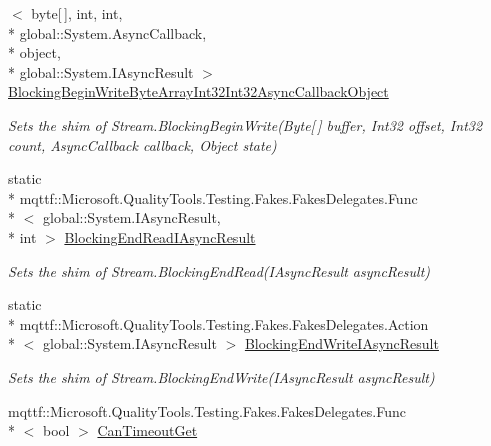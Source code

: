 \begin{DoxyCompactItemize}
$<$ byte\mbox{[}$\,$\mbox{]}, int, int, \\*
global\-::\-System.\-Async\-Callback, \\*
object, \\*
global\-::\-System.\-I\-Async\-Result $>$ \hyperlink{class_system_1_1_i_o_1_1_fakes_1_1_shim_stream_a09da5c6c1a4e8d9bc9e2c88b9a618af1}{Blocking\-Begin\-Write\-Byte\-Array\-Int32\-Int32\-Async\-Callback\-Object}
\begin{DoxyCompactList}\small\item\em Sets the shim of Stream.\-Blocking\-Begin\-Write(\-Byte\mbox{[}$\,$\mbox{]} buffer, Int32 offset, Int32 count, Async\-Callback callback, Object state)\end{DoxyCompactList}\item 
static \\*
mqttf\-::\-Microsoft.\-Quality\-Tools.\-Testing.\-Fakes.\-Fakes\-Delegates.\-Func\\*
$<$ global\-::\-System.\-I\-Async\-Result, \\*
int $>$ \hyperlink{class_system_1_1_i_o_1_1_fakes_1_1_shim_stream_aee49881f5d1709cbed0cca7865b98df6}{Blocking\-End\-Read\-I\-Async\-Result}
\begin{DoxyCompactList}\small\item\em Sets the shim of Stream.\-Blocking\-End\-Read(\-I\-Async\-Result async\-Result)\end{DoxyCompactList}\item 
static \\*
mqttf\-::\-Microsoft.\-Quality\-Tools.\-Testing.\-Fakes.\-Fakes\-Delegates.\-Action\\*
$<$ global\-::\-System.\-I\-Async\-Result $>$ \hyperlink{class_system_1_1_i_o_1_1_fakes_1_1_shim_stream_acbedf176129493362d90e311d3c31b1b}{Blocking\-End\-Write\-I\-Async\-Result}
\begin{DoxyCompactList}\small\item\em Sets the shim of Stream.\-Blocking\-End\-Write(\-I\-Async\-Result async\-Result)\end{DoxyCompactList}\item 
mqttf\-::\-Microsoft.\-Quality\-Tools.\-Testing.\-Fakes.\-Fakes\-Delegates.\-Func\\*
$<$ bool $>$ \hyperlink{class_system_1_1_i_o_1_1_fakes_1_1_shim_stream_a24c535d474ee5a439e728e1cb80572dd}{Can\-Timeout\-Get}

\end{DoxyCompactItemize}
